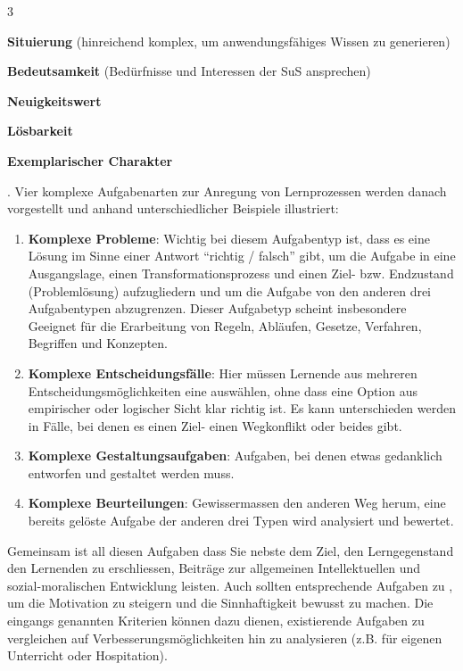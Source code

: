 \begin{landscape}
\begin{multicols*}{3}
\begin{myBox}[title=``Gestaltung von Unterricht'' \cite{tulo}]
\begin{enumerate*}
\item \textbf{Situierung} (hinreichend komplex, um anwendungsfähiges Wissen zu generieren)
\item \textbf{Bedeutsamkeit} (Bedürfnisse und Interessen der SuS ansprechen)
\item \textbf{Neuigkeitswert}
\item \textbf{Lösbarkeit}
\item \textbf{Exemplarischer Charakter}
\end{enumerate*}.
Vier komplexe Aufgabenarten zur Anregung von Lernprozessen werden danach vorgestellt und anhand unterschiedlicher Beispiele illustriert:
\begin{enumerate}
\item \textbf{Komplexe Probleme}: Wichtig bei diesem Aufgabentyp ist, dass es eine Lösung im Sinne einer Antwort ``richtig / falsch'' gibt, um die Aufgabe in eine Ausgangslage, einen Transformationsprozess und einen Ziel- bzw. Endzustand (Problemlösung) aufzugliedern und um die Aufgabe von den anderen drei Aufgabentypen abzugrenzen. Dieser Aufgabetyp scheint insbesondere Geeignet für die Erarbeitung von Regeln, Abläufen, Gesetze, Verfahren, Begriffen und Konzepten.
\item \textbf{Komplexe Entscheidungsfälle}: Hier müssen Lernende aus mehreren Entscheidungsmöglichkeiten eine auswählen, ohne dass eine Option aus empirischer oder logischer Sicht klar richtig ist. Es kann unterschieden werden in Fälle, bei denen es einen Ziel- einen Wegkonflikt oder beides gibt.
\item \textbf{Komplexe Gestaltungsaufgaben}: Aufgaben, bei denen etwas gedanklich entworfen und gestaltet werden muss.
\item \textbf{Komplexe Beurteilungen}: Gewissermassen den anderen Weg herum, eine bereits gelöste Aufgabe der anderen drei Typen wird analysiert und bewertet.
\end{enumerate}
Gemeinsam ist all diesen Aufgaben dass Sie nebste dem Ziel, den Lerngegenstand den Lernenden zu erschliessen, Beiträge zur allgemeinen Intellektuellen und sozial-moralischen Entwicklung leisten. Auch sollten entsprechende Aufgaben zu , um die Motivation zu steigern und die Sinnhaftigkeit bewusst zu machen. Die eingangs genannten Kriterien können dazu dienen, existierende Aufgaben zu vergleichen auf Verbesserungsmöglichkeiten hin zu analysieren (z.B. für eigenen Unterricht oder Hospitation).
\end{myBox} 
\end{multicols*}
\end{landscape}
\newpage
\restoregeometry


